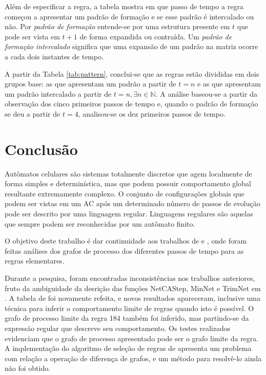 \documentclass[12pt,a4paper]{article}
\begin{document}
Além de especificar a regra, a tabela mostra em que passo de tempo a regra
começou a apresentar um padrão de formação e se esse padrão é intercalado
ou não. Por \textit{padrão de formação} entende-se por uma estrutura
presente em $t$ que pode ser vista em $t+1$ de forma expandida ou contraída.
Um \textit{padrão de formação intercalado} significa que uma
expansão de um padrão na matriz ocorre a cada dois instantes de tempo.

A partir da Tabela \ref{tab:pattern}, conclui-se que as regras estão divididas
em dois grupos base: as que apresentam um padrão a partir de $t=n$ e as que
apresentam um padrão intercalado a partir de $t=n,\exists n \in \mathbb{N}$.
A análise baseou-se a partir da observação dos cinco primeiros passos de
tempo e, quando o padrão de formação se deu a partir de $t=4$, analisou-se
os dez primeiros passos de tempo.

\newpage

\section{Conclusão}\label{sec:conclude}

Autômatos celulares são sistemas totalmente discretos que agem localmente
de forma simples e determinística, mas que podem possuir
comportamento global resultante extremamente complexo. O conjunto de
configurações globais que podem ser vistas em um AC após um determinado
número de passos de evolução pode ser descrito por uma linguagem
regular. Linguagens regulares são aquelas que sempre podem ser reconhecidas
por um autômato finito.

O objetivo deste trabalho é dar continuidade aos trabalhos de
 e , onde foram feitas
análises dos grafos de processo dos diferentes passos de tempo
para as regras elementares.

Durante a pesquisa, foram encontradas inconsistências nos trabalhos anteriores,
fruto da ambiguidade da desrição das funções NetCAStep, MinNet e TrimNet 
em . A tabela de  foi novamente
refeita, e novos resultados apareceram, inclusive uma técnica para inferir
o comportamento limite de regras quando isto é possível. O grafo de processo
limite da regra 184 também foi inferido, mas partindo-se da expressão regular
que descreve seu comportamento. Os testes realizados evidenciam que o grafo
de processo apresentado pode ser o grafo limite da regra. A implementação do
algoritmo de seleção de regras de  apresenta um
problema com relação a operação de diferença de grafos, e um método para
resolvê-lo ainda não foi obtido.
\end{document}
